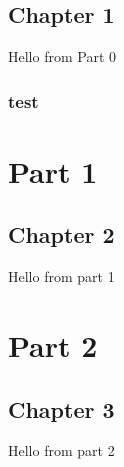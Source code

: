 \documentclass{report}
\begin{document}
\chapter{Chapter 1}
Hello from Part 0

\section{test}

\part{Part 1}

\chapter{Chapter 2}
Hello from part 1

\part{Part 2}

\chapter{Chapter 3}
Hello from part 2
\end{document}
